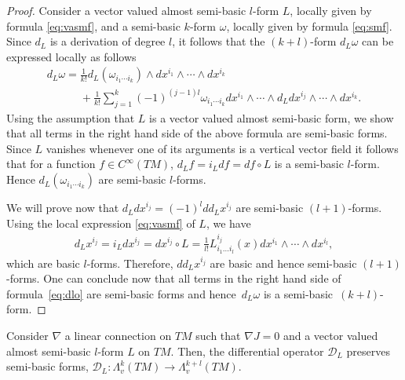 \begin{proof}
Consider a vector valued almost semi-basic $l$-form $L$, locally given
by formula \eqref{eq:vasmf}, and a semi-basic $k$-form $\omega$, locally given by formula
\eqref{eq:smf}. Since $d_L$ is a derivation of degree $l$, it follows
that the $(k+l)$-form $d_L\omega$ can be
expressed locally as follows
\begin{gather}
\nonumber d_L\omega  =  \frac{1}{k!}d_L(\omega_{i_1\cdots
  i_k})\wedge  dx^{i_1}\wedge \cdots \wedge dx^{i_k}  \\[-0.5ex]
 \phantom{d_L\omega  =}{}  +  \frac{1}{k!}
\sum^k_{j=1}(-1)^{(j-1)l} \omega_{i_1\cdots
  i_k} dx^{i_1}\wedge \cdots \wedge d_Ldx^{i_j} \wedge \cdots \wedge
dx^{i_k}. \label{eq:dlo}
\end{gather}
Using the assumption that $L$ is a vector valued almost semi-basic
form, we show that all terms in the right hand side of the above formula
are semi-basic forms. Since $L$ vanishes whenever one of its arguments
is a vertical vector f\/ield it follows that for a function $f\in C^{\infty}(TM)$, $d_Lf=i_Ldf=df\circ
L$ is a semi-basic $l$-form. Hence $d_L(\omega_{i_1\cdots i_k})$ are semi-basic $l$-forms.

We will prove now that $d_Ldx^{i_j}=(-1)^ldd_Lx^{i_j} $ are semi-basic
$(l+1)$-forms. Using the local expression \eqref{eq:vasmf} of $L$, we have
\begin{gather*} d_Lx^{i_j}=i_Ldx^{i_j} = dx^{i_j}\circ L =\frac{1}{l!}
L^{i_j}_{i_1\dots i_l}(x) dx^{i_1}\wedge \cdots \wedge
dx^{i_l},%
\end{gather*}
which are basic $l$-forms. Therefore, $dd_Lx^{i_j}$ are basic and hence
semi-basic $(l+1)$-forms.
One can conclude now that all terms in the right hand side of formula~\eqref{eq:dlo} are
semi-basic forms and hence~$d_L\omega$ is a semi-basic~$(k+l)$-form.
\end{proof}

\begin{Lemma} \label{lem:nablaomega} Consider $\nabla$ a linear connection on $TM$ such
that $\nabla J=0$ and a vector valued almost semi-basic $l$-form
$L$ on $TM$. Then, the differential operator ${\mathcal D}_L$
preserves semi-basic forms, ${\mathcal D}_L: \Lambda^k_v(TM) \to
\Lambda^{k+l}_v(TM).$
\end{Lemma}

